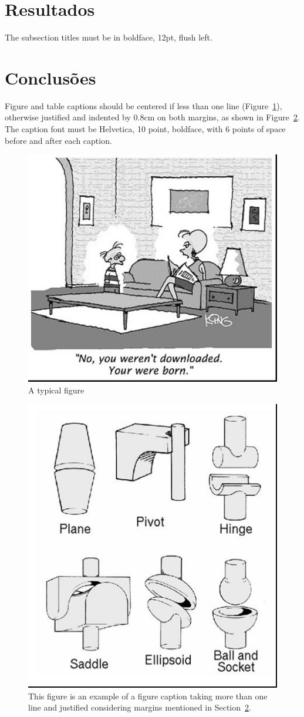 \documentclass[12pt]{article}
\begin{document}
\section{Resultados}

The subsection titles must be in boldface, 12pt, flush left.

\section{Conclusões}
\label{sec:figs}

Figure and table captions should be centered if less than one line
(Figure~\ref{fig:exampleFig1}), otherwise justified and indented by 0.8cm on
both margins, as shown in Figure~\ref{fig:exampleFig2}. The caption font must
be Helvetica, 10 point, boldface, with 6 points of space before and after each
caption.

\begin{figure}[ht]
\centering
\includegraphics[width=.5\textwidth]{fig1.jpg}
\caption{A typical figure}
\label{fig:exampleFig1}
\end{figure}

\begin{figure}[ht]
\centering
\includegraphics[width=.3\textwidth]{fig2.jpg}
\caption{This figure is an example of a figure caption taking more than one
  line and justified considering margins mentioned in Section~\ref{sec:figs}.}
\label{fig:exampleFig2}
\end{figure}
\end{document}
